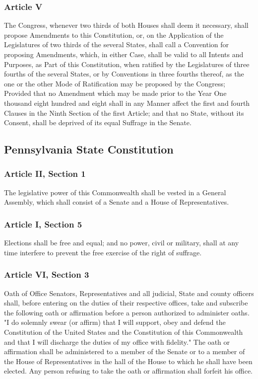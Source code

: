 \documentclass[11pt]{article} %
\begin{document}
\begin{enumerate}
\subsubsection{Article V}
\label{sec:ArticleVUS}
 The Congress, whenever two thirds of both Houses shall deem it necessary, shall propose Amendments to this Constitution, or, on the Application of the Legislatures of two thirds of the several States, shall call a Convention for proposing Amendments, which, in either Case, shall be valid to all Intents and Purposes, as Part of this Constitution, when ratified by the Legislatures of three fourths of the several States, or by Conventions in three fourths thereof, as the one or the other Mode of Ratification may be proposed by the Congress; Provided that no Amendment which may be made prior to the Year One thousand eight hundred and eight shall in any Manner affect the first and fourth Clauses in the Ninth Section of the first Article; and that no State, without its Consent, shall be deprived of its equal Suffrage in the Senate. 

\subsection{Pennsylvania State Constitution}
\subsubsection{Article II, Section 1}
\label{sec:ArticleIISection1PA}
The legislative power of this Commonwealth shall be vested in a General Assembly, which shall consist of a Senate and a House of Representatives. 

\subsubsection{ Article I, Section 5}
\label{sec:ArticleISection5PA}
  Elections shall be free and equal; and no power, civil or military, shall at any time interfere to prevent the free exercise of the right of suffrage.

\subsubsection{ Article VI, Section 3}
\label{sec:ArticleVISection3PA}
 Oath of Office  Senators, Representatives and all judicial, State and county officers shall, before entering on the duties of their respective offices, take and subscribe the following oath or affirmation before a person authorized to administer oaths. "I do solemnly swear (or affirm) that I will support, obey and defend the Constitution of the United States and the Constitution of this Commonwealth and that I will discharge the duties of my office with fidelity." The oath or affirmation shall be administered to a member of the Senate or to a member of the House of Representatives in the hall of the House to which he shall have been elected. Any person refusing to take the oath or affirmation shall forfeit his office. 



{}



\end{enumerate}
\end{document}

